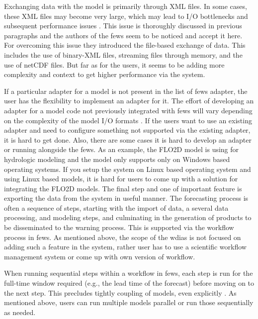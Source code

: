 Exchanging data with the model is primarily through XML files. In some cases, these XML files may become very large, which may lead to I/O bottlenecks and subsequent performance issues \cite{Werner2013TheSystem}. This issue is thoroughly discussed in previous paragraphs and the authors of the \acrshort{fews} \cite{Werner2013TheSystem} seem to be noticed and accept it here. For overcoming this issue they introduced the file-based exchange of data. This includes the use of binary-XML files, streaming files through memory, and the use of \acrshort{netCDF} files. But far as for the users, it seems to be adding more complexity and context to get higher performance via the system.

If a particular adapter for a model is not present in the list of \acrshort{fews} adapter, the user has the flexibility to implement an adapter for it. The effort of developing an adapter for a model code not previously integrated with \acrshort{fews} will vary depending on the complexity of the model I/O formats \cite{Werner2013TheSystem}. If the users want to use an existing adapter and need to configure something not supported via the existing adapter, it is hard to get done. Also, there are some cases it is hard to develop an adapter or running alongside the \acrshort{fews}. As an example, the FLO2D model is using for hydrologic modeling and the model only supports only on Windows based operating systems. If you setup the system on Linux based operating system and using Linux based models, it is hard for users to come up with a solution for integrating the FLO2D models.
The final step and one of important feature is exporting the data from the system in useful manner.
The forecasting process is often a sequence of steps, starting with the import of data, a several data processing, and modeling steps, and culminating in the generation of products to be disseminated to the warning process. This is supported via the workflow process in \acrshort{fews}. As mentioned above, the scope of the \acrshort{wdias} is not focused on adding such a feature in the system, rather user has to use a scientific workflow management system or come up with own version of workflow.

When running sequential steps within a workflow in \acrshort{fews}, each step is run for the full-time window required (e.g., the lead time of the forecast) before moving on to the next step. This precludes tightly coupling of models, even explicitly \cite{Werner2013TheSystem}. As mentioned above, users can run multiple models parallel or run those sequentially as needed. 
